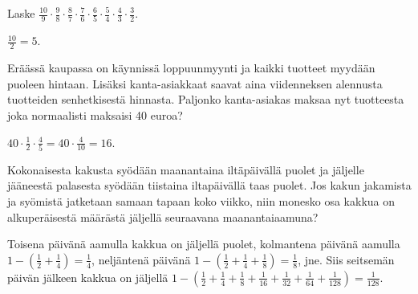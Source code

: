     \begin{tehtava}
        Laske 
        $\frac{10}{9}\cdot \frac{9}{8}\cdot \frac{8}{7}\cdot \frac{7}{6}\cdot \frac{6}{5}
            \cdot \frac{5}{4}\cdot \frac{4}{3}\cdot \frac{3}{2}$.
        
        \begin{vastaus}
            $\frac{10}{2}=5$.
        \end{vastaus}        
    \end{tehtava}
    
    \begin{tehtava}
    	Eräässä kaupassa on käynnissä loppuunmyynti ja kaikki tuotteet
        myydään puoleen hintaan. Lisäksi kanta-asiakkaat saavat aina
        viidenneksen alennusta tuotteiden senhetkisestä hinnasta.
    	Paljonko kanta-asiakas maksaa nyt tuotteesta joka normaalisti
        maksaisi 40 euroa?
    	\begin{vastaus}
    	$40\cdot \frac{1}{2} \cdot \frac{4}{5}=40\cdot \frac{4}{10}= 16$. 
    	\end{vastaus}
    \end{tehtava}
    
    \begin{tehtava}
        Kokonaisesta kakusta syödään maanantaina iltäpäivällä puolet ja jäljelle
        jääneestä palasesta syödään tiistaina 	iltapäivällä taas puolet.
        Jos kakun jakamista ja syömistä jatketaan samaan tapaan koko viikko, niin monesko 
        osa kakkua on alkuperäisestä määrästä jäljellä seuraavana maanantaiaamuna?
        
        \begin{vastaus}
            Toisena päivänä aamulla kakkua on jäljellä puolet, kolmantena
            päivänä aamulla
                $1-\left(\frac{1}{2} + \frac{1}{4}\right) = \frac{1}{4}$, 
            neljäntenä päivänä
                $1-\left(\frac{1}{2} + \frac{1}{4} + \frac{1}{8}\right)
                = \frac{1}{8}$, jne.
            Siis seitsemän päivän jälkeen kakkua on jäljellä
                $1-\left(\frac{1}{2} + \frac{1}{4} + \frac{1}{8} +
                \frac{1}{16} + \frac{1}{32} + \frac{1}{64} + \frac{1}{128}\right)
                = \frac{1}{128}$.  
        \end{vastaus}
    \end{tehtava}
